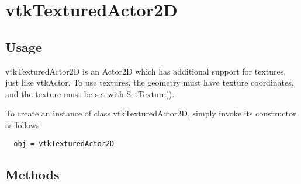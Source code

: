 \section{vtkTexturedActor2D}

\subsection{Usage}

 vtkTexturedActor2D is an Actor2D which has additional support for
 textures, just like vtkActor. To use textures, the geometry must have
 texture coordinates, and the texture must be set with SetTexture().

To create an instance of class vtkTexturedActor2D, simply
invoke its constructor as follows
\begin{verbatim}
  obj = vtkTexturedActor2D
\end{verbatim}
\subsection{Methods}

